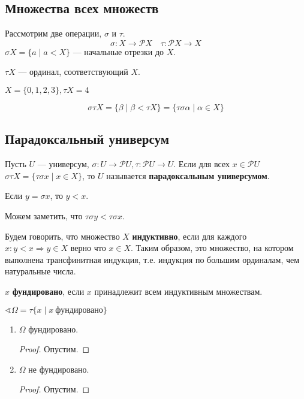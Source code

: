 \subsection{Множества всех множеств}

Рассмотрим две операции, \(\sigma\) и \(\tau\).
\[\sigma : X \to \mathcal{P} X \quad \tau : \mathcal{P} X \to X\]
\(\sigma X = \{a \mid a < X\}\) --- начальные отрезки до \(X\).

\(\tau X\) --- ординал, соответствующий \(X\).
\begin{example}
    \(X = \{0, 1, 2, 3\}, \tau X = 4\)
\end{example}
\[\sigma \tau X = \{\beta \mid \beta < \tau X\} = \{\tau \sigma \alpha \mid \alpha \in X\}\]

\subsection{Парадоксальный универсум}

\begin{definition}
    Пусть \(U\) --- универсум, \(\sigma : U \to \mathcal{P}U, \tau : \mathcal{P}U \to U\). Если для всех \(x \in \mathcal{P} U\) \(\sigma \tau X = \{\tau \sigma x \mid x \in X\}\), то \(U\) называется \textbf{парадоксальным универсумом}.
\end{definition}

\begin{definition}
    Если \(y = \sigma x\), то \(y < x\).
\end{definition}

Можем заметить, что \(\tau \sigma y < \tau \sigma x\).

\begin{definition}
    Будем говорить, что множество \(X\) \textbf{индуктивно}, если для каждого \(x : y < x \Rightarrow y \in X\) верно что \(x \in X\). Таким образом, это множество, на котором выполнена трансфинитная индукция, т.е. индукция по большим ординалам, чем натуральные числа.
\end{definition}

\begin{definition}
    \(x\) \textbf{фундировано}, если \(x\) принадлежит всем индуктивным множествам.
\end{definition}

\(\sphericalangle \Omega = \tau \{x \mid x\ \mathrm{фундировано}\}\)

\begin{enumerate}
    \item \(\Omega\) фундировано.\label{противоречие универсума 1}
          \begin{proof}
              Опустим.
          \end{proof}
    \item \(\Omega\) не фундировано.\label{противоречие универсума 2}
          \begin{proof}
              Опустим.
          \end{proof}
\end{enumerate}

